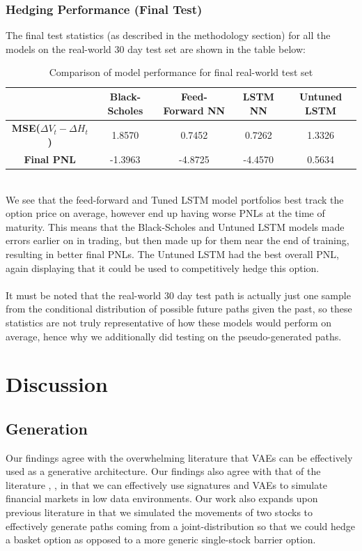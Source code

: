 \documentclass{article}
\theoremstyle{definition}
\begin{document}
\subsubsection{Hedging Performance (Final Test)}
The final test statistics (as described in the methodology section) for all the models on the real-world 30 day test set are shown in the table below: 
\begin{table}[h!]
    \centering
    \begin{tabular}{|c|c|c|c|c|}
        \hline
        & \textbf{Black-Scholes} & \textbf{Feed-Forward NN} & \textbf{LSTM NN} & \textbf{Untuned LSTM} \\ 
        \hline
        \textbf{MSE($\Delta V_t-\Delta H_t$)}&1.8570 & 0.7452&0.7262 &1.3326\\
        \hline
        \textbf{Final PNL} &-1.3963 &-4.8725 &-4.4570 & 0.5634\\
        \hline
    \end{tabular}
    \caption{Comparison of model performance for final real-world test set}
\end{table}\\
\noindent
We see that the feed-forward and Tuned LSTM model portfolios best track the option price on average, however end up having worse PNLs at the time of maturity. This means that the Black-Scholes and Untuned LSTM models made errors earlier on in trading, but then made up for them near the end of training, resulting in better final PNLs. The Untuned LSTM had the best overall PNL, again displaying that it could be used to competitively hedge this option.\\\\
It must be noted that the real-world 30 day test path is actually just one sample from the conditional distribution of possible future paths given the past, so these statistics are not truly representative of how these models would perform on average, hence why we additionally did testing on the pseudo-generated paths.

\newpage
\section{Discussion}
\subsection{Generation}
Our findings agree with the overwhelming literature that VAEs can be effectively used as a generative architecture. Our findings also agree with that of the literature \cite{buehler2020data}, \cite{buehler2020generating}, \cite{stangroom2023deephedging} in that we can effectively use signatures and VAEs to simulate financial markets in low data environments. Our work also expands upon previous literature in that we simulated the movements of two stocks to effectively generate paths coming from a joint-distribution so that we could hedge a basket option as opposed to a more generic single-stock barrier option.
\end{document}
